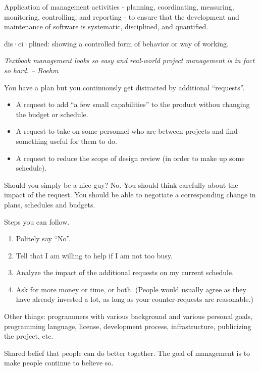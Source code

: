 \documentclass[landscape,30pt]{foils}
\begin{document}

Application of management activities - planning, coordinating, measuring, monitoring, controlling, and reporting - to ensure that
the development and maintenance of software is systematic,  disciplined, and quantified.

dis·ci·plined: showing a controlled form of behavior or way of working.


{\em Textbook management looks so easy and real-world project management
  is in fact so hard.  -- Boehm}


You have a plan but you continuously get distracted by additional ``requests''.

\begin{itemize}
  \item A request to add ``a few small capabilities'' to the product withou changing the budget or
    schedule.
  \item A request to take on some personnel who are between projects and find something useful for them to do.
  \item A request to reduce the scope of design review (in order to make up some schedule).
\end{itemize}

Should you simply be a nice guy?  No.  You should think carefully
about the impact of the request.  You should be able to negotiate a
corresponding change in plans, schedules and budgets.

Steps you can follow.

\begin{enumerate}
\item Politely say ``No''.
\item Tell that I am willing to help if I am not too busy.
\item Analyze the impact of the additional requests on my current schedule.
\item Ask for more money or time, or both.  (People would usually agree as they have already invested a lot, as long as your counter-requests are reasonable.)
\end{enumerate}


Other things: programmers with various background and various personal goals, programming language, license, development process, infrastructure,  publicizing the project, etc.


Shared belief that people can do better together.  The goal of management is to make people continue to believe so.
\end{document}
